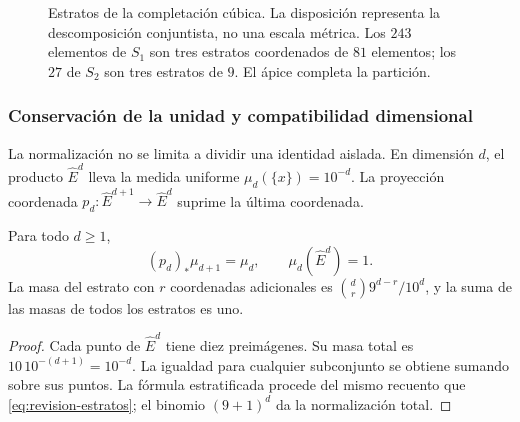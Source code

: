 \begin{figure}[htbp]
\centering
{}
\caption{Estratos de la completación cúbica. La disposición representa
la descomposición conjuntista, no una escala métrica. Los \(243\) elementos
de \(S_1\) son tres estratos coordenados de \(81\) elementos; los \(27\)
de \(S_2\) son tres estratos de \(9\). El ápice completa la partición.}
\label{fig:revision-emrh}
\end{figure}



\subsubsection{Conservación de la unidad y compatibilidad dimensional}

La normalización no se limita a dividir una identidad aislada. En dimensión
\(d\), el producto \(\widehat E^d\) lleva la medida uniforme
\(\mu_d(\{x\})=10^{-d}\). La proyección coordenada
\(p_d:\widehat E^{d+1}\to\widehat E^d\) suprime la última coordenada.

\begin{samepage}
\begin{proposition}
Para todo \(d\geq1\),
\[
 (p_d)_*\mu_{d+1}=\mu_d,
 \qquad \mu_d(\widehat E^d)=1.
\]
La masa del estrato con \(r\) coordenadas adicionales es
\(\binom dr9^{d-r}/10^d\), y la suma de las masas de todos los estratos
es uno.
\end{proposition}
\end{samepage}
\begin{proof}
Cada punto de \(\widehat E^d\) tiene diez preimágenes. Su masa total es
\(10\,10^{-(d+1)}=10^{-d}\). La igualdad para cualquier subconjunto
se obtiene sumando sobre sus puntos. La fórmula estratificada procede
del mismo recuento que \eqref{eq:revision-estratos}; el binomio
\((9+1)^d\) da la normalización total.
\end{proof}

